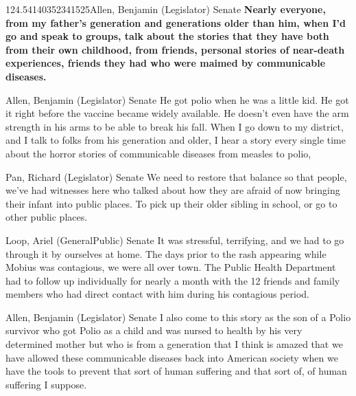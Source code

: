 \begin{result}{124.54140352341525}{Allen, Benjamin (Legislator) Senate}
\textbf{Nearly everyone, from my father's generation and generations older than him, when I'd go and speak to groups, talk about the stories that they have both from their own childhood, from friends, personal stories of near-death experiences, friends they had who were maimed by communicable diseases.
}\end{result}

\begin{result}{34.29720621046978}{Allen, Benjamin (Legislator) Senate}
He got polio when he was a little kid. He got it right before the vaccine became widely available. He doesn't even have the arm strength in his arms to be able to break his fall. When I go down to my district, and I talk to folks from his generation and older, I hear a story every single time about the horror stories of communicable diseases from measles to polio,
\end{result}

\begin{result}{26.05429533906798}{Pan, Richard (Legislator) Senate}
We need to restore that balance so that people, we've had witnesses here who talked about how they are afraid of now bringing their infant into public places. To pick up their older sibling in school, or go to other public places.
\end{result}

\begin{result}{25.088158617771164}{Loop, Ariel (GeneralPublic) Senate}
It was stressful, terrifying, and we had to go through it by ourselves at home. The days prior to the rash appearing while Mobius was contagious, we were all over town. The Public Health Department had to follow up individually for nearly a month with the 12 friends and family members who had direct contact with him during his contagious period.
\end{result}

\begin{result}{24.77568407629558}{Allen, Benjamin (Legislator) Senate}
I also come to this story as the son of a Polio survivor who got Polio as a child and was nursed to health by his very determined mother but who is from a generation that I think is amazed that we have allowed these communicable diseases back into American society when we have the tools to prevent that sort of human suffering and that sort of, of human suffering I suppose.
\end{result}

